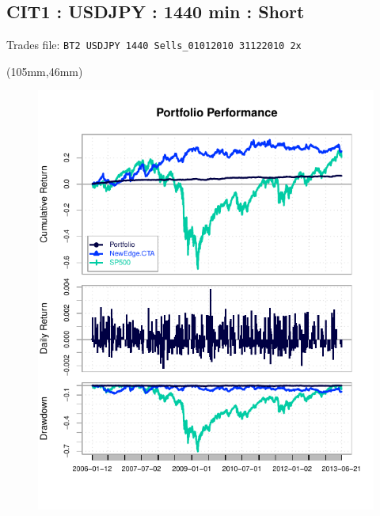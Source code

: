 \documentclass[nohyper,justified]{tufte-handout}\usepackage{graphicx, color}
\makeatletter
\def\maxwidth{ %
  \ifdim\Gin@nat@width>\linewidth
    \linewidth
  \else
    \Gin@nat@width
  \fi
}
\newenvironment{knitrout}{}{} %
\makeatother
\begin{document}
\begin{wide}
\section{\Huge CIT1 : USDJPY : 1440 min : Short}
{\Large Trades file: \verb+BT2 USDJPY 1440 Sells_01012010 31122010 2x+ }

\hrulefill 
\end{wide}

\begin{textblock*}{105mm}(105mm,46mm)
\begin{figure}
\vspace{0pt}
\begin{knitrout}
\color{fgcolor}
\includegraphics[width=\maxwidth]{figure/Performance} 

\end{knitrout}

\end{figure}
\end{textblock*}
\end{document}
